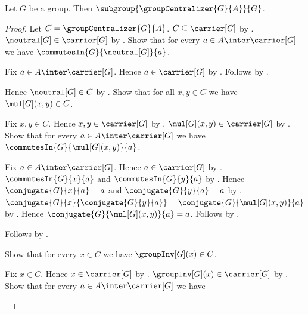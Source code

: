 \begin{theorem}\label{group_centralizer_subgroup}
    Let $G$ be a group.
    Then $\subgroup{\groupCentralizer{G}{A}}{G}$.
\end{theorem}
\begin{proof}
    Let $C=\groupCentralizer{G}{A}$.
    $C\subseteq\carrier[G]$ by
        .
    $\neutral[G]\in\carrier[G]$ by
        .
    Show that for every $a\in A\inter\carrier[G]$ we have
        $\commutesIn{G}{\neutral[G]}{a}$.
    \begin{subproof}
        Fix $a\in A\inter\carrier[G]$.
        Hence $a\in\carrier[G]$ by .
        Follows by
            .
    \end{subproof}
    Hence $\neutral[G]\in C$ by
        .
    Show that for all $x,y\in C$ we have $\mul[G](x,y)\in C$.
    \begin{subproof}
        Fix $x,y\in C$.
        Hence $x,y\in\carrier[G]$ by .
        $\mul[G](x,y)\in\carrier[G]$ by
            .
        Show that for every $a\in A\inter\carrier[G]$ we have
            $\commutesIn{G}{\mul[G](x,y)}{a}$.
        \begin{subproof}
            Fix $a\in A\inter\carrier[G]$.
            Hence $a\in\carrier[G]$ by .
            $\commutesIn{G}{x}{a}$ and $\commutesIn{G}{y}{a}$ by
                .
            Hence $\conjugate{G}{x}{a}=a$ and
                $\conjugate{G}{y}{a}=a$ by
                .
            $\conjugate{G}{x}{\conjugate{G}{y}{a}}=
                \conjugate{G}{\mul[G](x,y)}{a}$ by
                .
            Hence $\conjugate{G}{\mul[G](x,y)}{a}=a$.
            Follows by .
        \end{subproof}
        Follows by .
    \end{subproof}
    Show that for every $x\in C$ we have $\groupInv[G](x)\in C$.
    \begin{subproof}
        Fix $x\in C$.
        Hence $x\in\carrier[G]$ by .
        $\groupInv[G](x)\in\carrier[G]$ by
            .
        Show that for every $a\in A\inter\carrier[G]$ we have

\end{subproof}
\end{proof}
